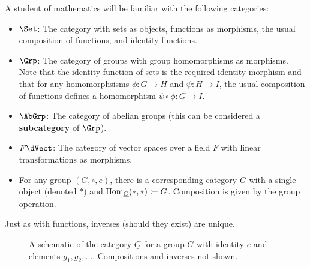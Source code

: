 \documentclass[12pt,twoside,draft]{reedthesis}
\let\oldindex\index
\renewcommand{\index}[1]{\oldindex{#1}\marginpar{\footnotesize\color{index}index: #1}}
\newcommand{\define}[1]{\textbf{#1}} %
\begin{document}
\begin{example}
  A student of mathematics will be familiar with the following categories:
  \begin{itemize}
    \itemsep-0.2em
    \item $\Set$: The category with sets as objects, functions as morphisms, 
      the usual composition of functions, and identity functions.
    \item $\Grp$: The category of groups with group homomorphisms
      as morphisms. Note that the identity function of sets is the required
      identity morphism and that for any homomorphsisms $\phi:G\to H$ and
      $\psi:H\to I$, the usual composition of functions defines a homomorphism
      $\psi\circ \phi:G\to I$.
    \item $\AbGrp$: The category of abelian groups (this can be considered a
      \define{subcategory} of $\Grp$).
    \item $F\dVect$: The category of vector spaces over a
      field $F$ with linear transformations as morphisms.
    \item For any group $(G,\circ,e)$, there is a corresponding category
      $\underline{G}$ with a single object (denoted $\ast$) and
      $\operatorname{Hom}_{\underline{G}}(\ast,\ast)\coloneqq G$. Composition is given by the
      group operation.
  \end{itemize}
\end{example}


Just as with functions, inverses (should they exist) are unique.

\begin{figure}[ht]
  \centering
  \caption{
    \label{fig:grp} A schematic of the category $\underline{G}$ for a
    group $G$ with identity $e$ and elements $g_1,g_2,\ldots$. Compositions and
    inverses not shown.
  }
\end{figure}
\end{document}
